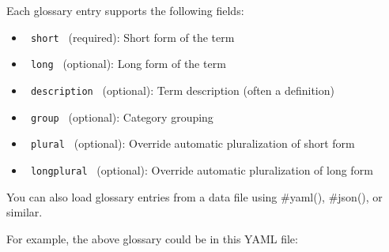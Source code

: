 \begin{Shaded}
\begin{Highlighting}[]
\NormalTok{    ),}
\NormalTok{    ),}
\NormalTok{    )}
\NormalTok{)}

\end{Highlighting}
\end{Shaded}

Each glossary entry supports the following fields:

\begin{itemize}
\tightlist
\item
  \texttt{\ short\ } (required): Short form of the term
\item
  \texttt{\ long\ } (optional): Long form of the term
\item
  \texttt{\ description\ } (optional): Term description (often a
  definition)
\item
  \texttt{\ group\ } (optional): Category grouping
\item
  \texttt{\ plural\ } (optional): Override automatic pluralization of
  short form
\item
  \texttt{\ longplural\ } (optional): Override automatic pluralization
  of long form
\end{itemize}

You can also load glossary entries from a data file using \#yaml(),
\#json(), or similar.

For example, the above glossary could be in this YAML file:

